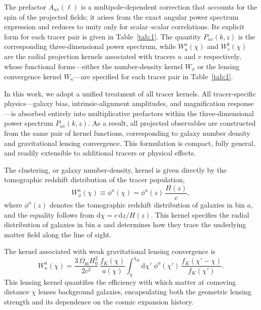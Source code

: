 The prefactor \(A_{uv}(\ell)\) is a multipole-dependent correction that accounts for the spin of the projected fields; it arises from the exact angular power spectrum expression and reduces to unity only for scalar--scalar correlations. Its explicit form for each tracer pair is given in Table~\ref{tab:1}. The quantity \(P_{uv}(k, z)\) is the corresponding three-dimensional power spectrum, while \(W_u^{a}(\chi)\) and \(W_v^{b}(\chi)\) are the radial projection kernels associated with tracers \(u\) and \(v\) respectively, whose functional forms---either the number-density kernel \(W_\phi\) or the lensing convergence kernel \(W_\kappa\)---are specified for each tracer pair in Table~\ref{tab:1}.

In this work, we adopt a unified treatment of all tracer kernels. All tracer-specific physics---galaxy bias, intrinsic-alignment amplitudes, and magnification response---is absorbed entirely into multiplicative prefactors within the three-dimensional power spectrum \(P_{uv}(k, z)\). As a result, all projected observables are constructed from the same pair of kernel functions, corresponding to galaxy number density and gravitational lensing convergence. This formulation is compact, fully general, and readily extensible to additional tracers or physical effects.

The clustering, or galaxy number-density, kernel is given directly by the tomographic redshift distribution of the tracer population,
\begin{equation} \label{eq:2.3}
    W_\phi^{a}(\chi) \equiv \phi^{a}(\chi) = \phi^{a}(z)\, \frac{H(z)}{c},
\end{equation}
where \(\phi^{a}(z)\) denotes the tomographic redshift distribution of galaxies in bin \(a\), and the equality follows from \(\mathrm{d}\chi = c\,\mathrm{d}z / H(z)\). This kernel specifies the radial distribution of galaxies in bin \(a\) and determines how they trace the underlying matter field along the line of sight.

The kernel associated with weak gravitational lensing convergence is
\begin{equation} \label{eq:2.4}
    W_\kappa^{a}(\chi) = \frac{3\,\Omega_{\mathrm m} H_0^2}{2 c^2} \, \frac{f_K(\chi)}{a(\chi)} \int_{\chi}^{\chi_{\mathrm H}} \mathrm{d}\chi'\; \phi^{a}(\chi') \, \frac{f_K(\chi' - \chi)}{f_K(\chi')}.
\end{equation}
This lensing kernel quantifies the efficiency with which matter at comoving distance \(\chi\) lenses background galaxies, encapsulating both the geometric lensing strength and its dependence on the cosmic expansion history.

